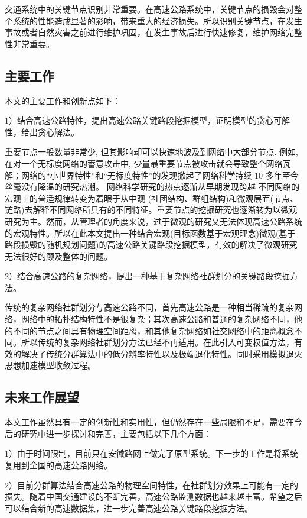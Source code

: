 
	交通系统中的关键节点识别非常重要。在高速公路系统中，关键节点的损毁会对整个系统的性能造成显著的影响，带来重大的经济损失。所以识别关键节点，在发生事故或者自然灾害之前进行维护巩固，在发生事故后进行快速修复，维护网络完整性非常重要。

	\subsection{主要工作}
		本文的主要工作和创新点如下：

		1）结合高速公路特性，提出高速公路关键路段挖掘模型，证明模型的贪心可解性，给出贪心解法。

			重要节点一般数量非常少, 但其影响却可以快速地波及到网络中大部分节点. 例如, 在对一个无标度网络的蓄意攻击中, 少量最重要节点被攻击就会导致整个网络瓦解；网络的“小世界特性”和“无标度特性”的发现掀起了网络科学持续 10 多年至今丝毫没有降温的研究热潮。 网络科学研究的热点逐渐从早期发现跨越 不同网络的宏观上的普适规律转变为着眼于从中观 (社团结构、群组结构)和微观层面(节点、链路)去解释不同网络所具有的不同特征。重要节点的挖掘研究也逐渐转为以微观研究为主。然而，从管理者的角度来说，过于微观的研究又无法体现高速公路系统的宏观特性。所以在此本文提出一种结合宏观(目标函数基于宏观理念)微观(基于路段损毁的随机规划问题)的高速公路关键路段挖掘模型，有效的解决了微观研究无法很好的顾及整体的问题。

		2）结合高速公路的复杂网络，提出一种基于复杂网络社群划分的关键路段挖掘方法。

			传统的复杂网络社群划分与高速公路不同，首先高速公路是一种相当稀疏的复杂网络，网络中的拓扑结构特性不是很复杂；其次高速公路和普通的复杂网络不同，他的不同的节点之间具有物理空间距离，和其他复杂网络如社交网络中的距离概念不同。所以传统的复杂网络社群划分方法已经不再适用。在此引入可变权值方法，有效的解决了传统分群算法中的低分辨率特性以及极端退化特性。同时采用模拟退火思想加速模型收敛过程。
	\subsection{未来工作展望}

		本文工作虽然具有一定的创新性和实用性，但仍然存在一些局限和不足，需要在今后的研究中进一步探讨和完善，主要包括以下几个方面：

		1）由于时间限制，目前只在安徽路网上做完了原型系统。下一步的工作是将系统复用到全国的高速公路网络。

		2）目前分群算法结合高速公路的物理空间特性，在社群划分效果上可能有一定的损失。随着中国交通建设的不断完善，高速公路监测数据也越来越丰富。希望之后可以结合新的高速数据集，进一步完善高速公路关键路段挖掘方法。

